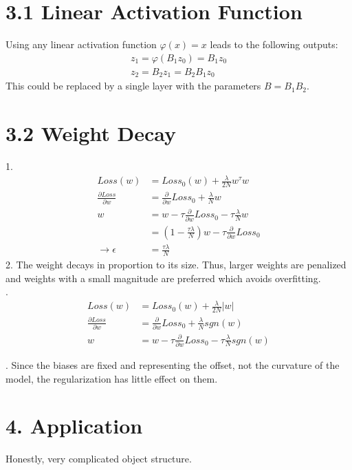 \documentclass{article}
\begin{document}
\newpage

\section*{3.1 Linear Activation Function}
Using any linear activation function $\varphi(x) = x$ leads to the following outputs:
\begin{align*}
z_1 = \varphi(B_1 z_0) = B_1z_0\\
z_2 = B_2z_1 = B_2B_1z_0
\end{align*}
This could be replaced by a single layer with the parameters $B = B_1B_2$.

\section*{3.2 Weight Decay}
1. \begin{align*}
Loss(w) &= Loss_0(w)+\frac{\lambda}{2N}w^{\tau}w\\
\frac{\partial Loss}{\partial w} &= \frac{\partial}{\partial w} Loss_0 + \frac{\lambda}{N}w\\
w &= w-\tau \frac{\partial}{\partial w}Loss_0 - \tau \frac{\lambda}{N}w \\
&= (1-\frac{\tau\lambda}{N})w -\tau \frac{\partial}{\partial w}Loss_0\\
\rightarrow \epsilon &= \frac{\tau\lambda}{N}
\end{align*}
2. The weight decays in proportion to its size. Thus, larger weights are penalized and weights with a small magnitude are preferred which avoids overfitting. \\

. \begin{align*}
Loss(w) &= Loss_0(w)+\frac{\lambda}{2N}|w|\\
\frac{\partial Loss}{\partial w}& = \frac{\partial}{\partial w} Loss_0 + \frac{\lambda}{N}sgn(w)\\
w &= w-\tau \frac{\partial}{\partial w}Loss_0 - \tau \frac{\lambda}{N}sgn(w) 
\end{align*}

. Since the biases are fixed and representing the offset, not the curvature of the model, the regularization has little effect on them.

\section*{4. Application}

Honestly, very complicated object structure.
\end{document}
